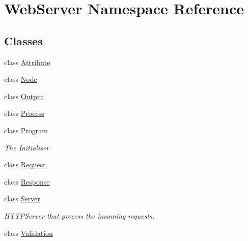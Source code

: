 \hypertarget{namespace_web_server}{}\section{Web\+Server Namespace Reference}
\label{namespace_web_server}
\subsection*{Classes}
\begin{DoxyCompactItemize}
\item 
class \hyperlink{class_web_server_1_1_attribute}{Attribute}
\item 
class \hyperlink{class_web_server_1_1_node}{Node}
\item 
class \hyperlink{class_web_server_1_1_output}{Output}
\item 
class \hyperlink{class_web_server_1_1_process}{Process}
\item 
class \hyperlink{class_web_server_1_1_program}{Program}
\begin{DoxyCompactList}\small\item\em The Initialiser \end{DoxyCompactList}\item 
class \hyperlink{class_web_server_1_1_request}{Request}
\item 
class \hyperlink{class_web_server_1_1_response}{Response}
\item 
class \hyperlink{class_web_server_1_1_server}{Server}
\begin{DoxyCompactList}\small\item\em H\+T\+T\+P\+Server that process the incoming requests. \end{DoxyCompactList}\item 
class \hyperlink{class_web_server_1_1_validation}{Validation}
\end{DoxyCompactItemize}
